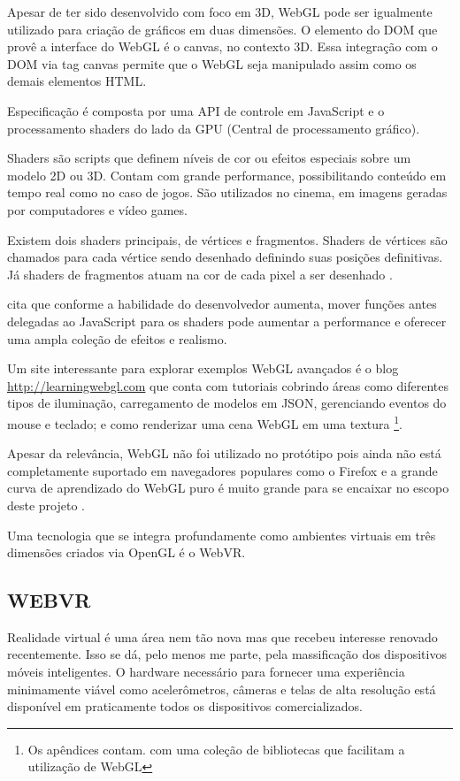 Apesar de ter sido desenvolvido com foco em 3D, WebGL pode ser
igualmente utilizado para criação de gráficos em duas
dimensões\autocite[pp. 6]{3daps}. O elemento do DOM que provê a
interface do WebGL é o canvas, no contexto 3D. Essa integração com
o DOM via tag canvas permite que o WebGL seja manipulado assim como os
demais elementos HTML.

Especificação é composta por uma API de controle em JavaScript
e o processamento shaders do lado da GPU (Central de processamento
gráfico). 

Shaders são scripts que definem níveis de cor ou efeitos especiais
sobre um modelo 2D ou 3D. Contam com grande performance, possibilitando
conteúdo em tempo real como no caso de jogos. São utilizados no
cinema, em imagens geradas por computadores e vídeo games.

Existem dois shaders principais, de vértices e fragmentos. Shaders de
vértices são chamados para cada vértice sendo desenhado definindo
suas posições definitivas. Já shaders de fragmentos atuam na cor de
cada pixel a ser desenhado \autocite[pp.15]{3daps}.

\cite{html5mostwanted} cita que conforme a habilidade do desenvolvedor
aumenta, mover funções antes delegadas ao JavaScript para os shaders
pode aumentar a performance e oferecer uma ampla coleção de efeitos e
realismo.

Um site interessante para explorar exemplos WebGL avançados é o blog
 \url{http://learningwebgl.com} que conta com tutoriais cobrindo áreas
como diferentes tipos de iluminação, carregamento de modelos em JSON,
gerenciando eventos do mouse e teclado; e como renderizar uma cena WebGL
em uma textura \autocite[pp.42]{3daps}\footnote{Os apêndices contam.
com uma coleção de bibliotecas que facilitam a utilização de WebGL}.

Apesar da relevância, WebGL não foi utilizado no protótipo pois
ainda não está completamente suportado em navegadores populares como
o Firefox e a grande curva de aprendizado do WebGL puro é muito grande
para se encaixar no escopo deste projeto .

Uma tecnologia que se integra profundamente como ambientes virtuais
em três dimensões criados via OpenGL é o WebVR.
\subsection{WEBVR}
Realidade virtual é uma área nem tão nova mas que recebeu interesse
renovado recentemente. Isso se dá, pelo menos me parte, pela
massificação dos dispositivos móveis inteligentes. O hardware
necessário para fornecer uma experiência minimamente viável como
acelerômetros, câmeras e telas de alta resolução está disponível
em praticamente todos os dispositivos comercializados.

